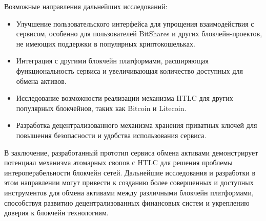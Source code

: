 Возможные направления дальнейших исследований:
\begin{itemize}
\item Улучшение пользовательского интерфейса для упрощения взаимодействия с сервисом, особенно для пользователей BitShares и других блокчейн-проектов, не имеющих поддержки в популярных криптокошельках.

\item Интеграция с другими блокчейн платформами, расширяющая функциональность сервиса и увеличивающая количество доступных для обмена активов.

\item Исследование возможности реализации механизма HTLC для других популярных блокчейнов, таких как Bitcoin и Litecoin.

\item Разработка децентрализованного механизма хранения приватных ключей для повышения безопасности и удобства использования сервиса.
\end{itemize}

В заключение, разработанный прототип сервиса обмена активами демонстрирует потенциал механизма атомарных свопов с HTLC для решения проблемы интероперабельности блокчейн сетей. Дальнейшие исследования и разработки в этом направлении могут привести к созданию более совершенных и доступных инструментов для обмена активами между различными блокчейн платформами, способствуя развитию децентрализованных финансовых систем и укреплению доверия к блокчейн технологиям.
